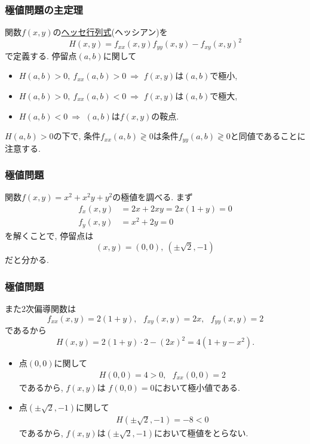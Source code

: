\begin{frame}
\frametitle{極値問題の主定理}


\begin{Thm} \label{停留点とヘッセ行列}
関数$f(x,y)$の\underline{ヘッセ行列式}(ヘッシアン)を
$$
H(x,y)
=f_{xx}(x,y)f_{yy}(x,y)-f_{xy}(x,y)^2
$$
で定義する. 
停留点$(a,b)$に関して 
\begin{itemize}
\item $H(a,b)>0, \ f_{xx}(a,b)>0 \ \Longrightarrow$ $f(x,y)$は$(a,b)$で極小, 
\item $H(a,b)>0, \ f_{xx}(a,b)<0 \ \Longrightarrow$ $f(x,y)$は$(a,b)$で極大, 
\item $H(a,b)<0 \ \Longrightarrow$ $(a,b)$は$f(x,y)$の鞍点. 
\end{itemize}
\end{Thm}

$H(a,b)>0$の下で, 条件$f_{xx}(a,b) \gtrless 0$は条件$f_{yy}(a,b)\gtrless 0$と同値であることに注意する. 

\end{frame}





\begin{frame}
\frametitle{極値問題}

関数$f(x,y)=x^2+x^2y+y^2$の極値を調べる. まず
\begin{align*}
f_x(x,y) &= 2x+2xy=2x(1+y)=0\\ 
f_y(x,y) &= x^2+2y=0
\end{align*}
を解くことで, 停留点は
$$
(x,y)=(0,0), \ (\pm \sqrt{2},-1)
$$
だと分かる. 

\end{frame}




\begin{frame}
\frametitle{極値問題}
また2次偏導関数は
$$
f_{xx}(x,y)=2(1+y), \ \ \ f_{xy}(x,y)=2x, \ \ \ f_{yy}(x,y)=2
$$
であるから
$$
H(x,y)=2(1+y) \cdot 2 - (2x)^2=4(1+y-x^2). 
$$

\begin{itemize}
\item 点$(0,0)$に関して
\begin{align*}
H(0,0)=4>0, \ \ \ f_{xx}(0,0) = 2
\end{align*}
であるから, $f(x,y)$は $f(0,0)=0$において極小値である. 
\item 点$(\pm \sqrt{2},-1)$に関して
\begin{align*}
H(\pm \sqrt{2},-1)=-8<0
\end{align*}
であるから, $f(x,y)$は$(\pm\sqrt{2},-1)$において極値をとらない.  
\end{itemize}

\end{frame}


